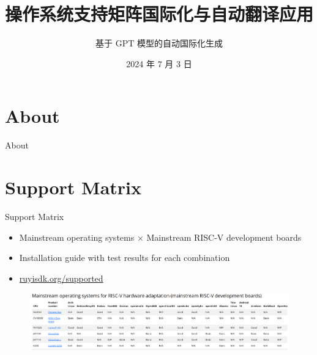 \documentclass{beamer}
\title{操作系统支持矩阵国际化与自动翻译应用}
\subtitle{基于 GPT 模型的自动国际化生成}
\institute{测试小队}
\date{2024 年 7 月 3 日}
\begin{document}
\kaishu
\begin{frame}
    \titlepage
\end{frame}

\begin{frame}
    \tableofcontents[sectionstyle=show,subsectionstyle=show/shaded/hide,subsubsectionstyle=show/shaded/hide]
\end{frame}

\section{About}

\begin{frame}{About}
\end{frame}

\section{Support Matrix}

\begin{frame}{Support Matrix}
    \begin{itemize}
        \item Mainstream operating systems $\times$ Mainstream RISC-V development boards
        \item Installation guide with test results for each combination
        \item \url{ruyisdk.org/supported}
    \end{itemize}
    \begin{figure}
        \centering
            \includegraphics[width=\textwidth]{pic/matrix.png}
    \end{figure}
\end{frame}
\end{document}
